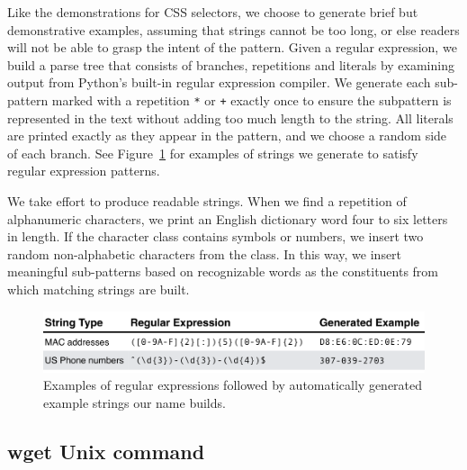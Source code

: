 Like the demonstrations for CSS selectors, we choose to generate brief but demonstrative examples, assuming that strings cannot be too long, or else readers will not be able to grasp the intent of the pattern.
Given a regular expression, we build a parse tree that consists of branches, repetitions and literals by examining output from Python's built-in regular expression compiler.
We generate each sub-pattern marked with a repetition \texttt{*} or \texttt{+} exactly once to ensure the subpattern is represented in the text without adding too much length to the string.
All literals are printed exactly as they appear in the pattern, and we choose a random side of each branch.
See Figure~\ref{fig:regex_strings} for examples of strings we generate to satisfy regular expression patterns.

We take effort to produce readable strings.
When we find a repetition of alphanumeric characters, we print an English dictionary word four to six letters in length.
If the character class contains symbols or numbers, we insert two random non-alphabetic characters from the class.
In this way, we insert meaningful sub-patterns based on recognizable words as the constituents from which matching strings are built.
\fi

\begin{figure}
\centering
\includegraphics[width=\columnwidth]{figures/regex-example-table}
\caption{Examples of regular expressions followed by automatically generated example strings our \Gls{name} builds.}
\label{fig:regex_strings}
\end{figure}

\subsection{wget Unix command}


